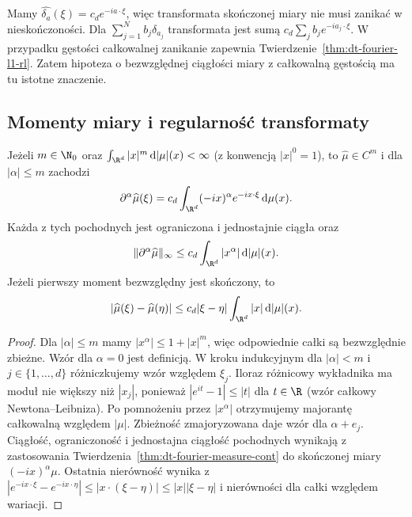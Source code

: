 \begin{przyklad}
\label{ex:dt-fourier-measure-atoms}
Mamy $\widehat{\delta_a}(\xi)=c_de^{-ia\cdot\xi}$,
więc transformata skończonej miary nie musi zanikać
w nieskończoności. Dla $\sum_{j=1}^N b_j\delta_{a_j}$
transformata jest sumą $c_d\sum_j b_je^{-ia_j\cdot\xi}$.
W przypadku gęstości całkowalnej zanikanie zapewnia
Twierdzenie~\ref{thm:dt-fourier-l1-rl}. Zatem hipoteza
o bezwzględnej ciągłości miary z całkowalną gęstością
ma tu istotne znaczenie.
\end{przyklad}


\subsection{Momenty miary i regularność transformaty}

\begin{twierdzenie}
\label{thm:dt-fourier-measure-moments}
Jeżeli $m\in\N_0$ oraz
$\int_{\R^d}|x|^m\,\mathrm d|\mu|(x)<\infty$
(z konwencją $|x|^0=1$), to $\widehat\mu\in C^m$
i dla $|\alpha|\le m$ zachodzi
\[
 \partial^\alpha\widehat\mu(\xi)
 =c_d\int_{\R^d}(-ix)^\alpha e^{-ix\cdot\xi}\,\mathrm d\mu(x).
\]
Każda z tych pochodnych jest ograniczona i jednostajnie
ciągła oraz
\[
 \|\partial^\alpha\widehat\mu\|_\infty
 \le c_d\int_{\R^d}|x^\alpha|\,\mathrm d|\mu|(x).
\]
Jeżeli pierwszy moment bezwzględny jest skończony, to
\[
 |\widehat\mu(\xi)-\widehat\mu(\eta)|
 \le c_d|\xi-\eta|\int_{\R^d}|x|\,\mathrm d|\mu|(x).
\]
\end{twierdzenie}
\begin{proof}
Dla $|\alpha|\le m$ mamy $|x^\alpha|\le1+|x|^m$,
więc odpowiednie całki są bezwzględnie zbieżne.
Wzór dla $\alpha=0$ jest definicją. W kroku indukcyjnym
dla $|\alpha|<m$ i $j\in\{1,\ldots,d\}$ różniczkujemy
wzór względem $\xi_j$. Iloraz różnicowy wykładnika
ma moduł nie większy niż $|x_j|$, ponieważ
$|e^{it}-1|\le |t|$ dla $t\in\R$ (wzór całkowy
Newtona--Leibniza). Po pomnożeniu przez $|x^\alpha|$
otrzymujemy majorantę całkowalną względem $|\mu|$.
Zbieżność zmajoryzowana daje wzór dla $\alpha+e_j$.
Ciągłość, ograniczoność i jednostajna ciągłość
pochodnych wynikają z zastosowania
Twierdzenia~\ref{thm:dt-fourier-measure-cont}
do skończonej miary $(-ix)^\alpha\mu$.
Ostatnia nierówność wynika z
$|e^{-ix\cdot\xi}-e^{-ix\cdot\eta}|
\le |x\cdot(\xi-\eta)|\le|x||\xi-\eta|$
i nierówności dla całki względem wariacji.
\end{proof}

